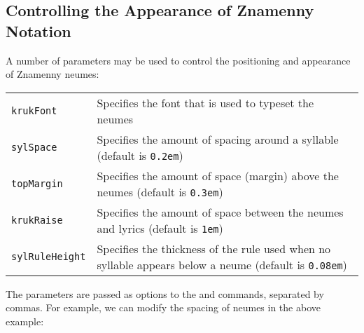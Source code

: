 \begin{EN}
\subsection{Controlling the Appearance of Znamenny Notation}

A number of parameters may be used to control the positioning and appearance of Znamenny neumes:

\begin{center}
\begin{tabular}{lp{3.5in}}
\hline
\verb+krukFont+ & Specifies the font that is used to typeset the neumes \\
\verb+sylSpace+ & Specifies the amount of spacing around a syllable (default is \verb+0.2em+) \\
\verb+topMargin+ & Specifies the amount of space (margin) above the neumes (default is \verb+0.3em+) \\
\verb+krukRaise+ & Specifies the amount of space between the neumes and lyrics (default is \verb+1em+) \\
\verb+sylRuleHeight+ & Specifies the thickness of the rule used when no syllable appears below a neume (default is \verb+0.08em+) \\
\hline
\end{tabular}
\end{center}

\noindent The parameters are passed as options to the  and  commands, separated by commas. For example, we can modify the spacing of neumes in the above example:
\end{EN}
%
